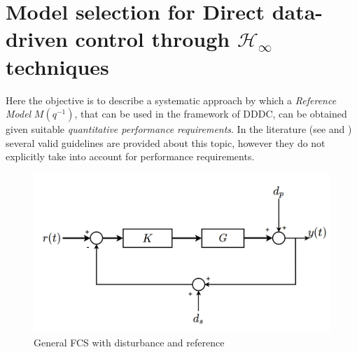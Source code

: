 \chapter[$\mathcal{H}_\infty$ approch for reference model in DDDC]{Model selection for Direct data-driven control through $\mathcal{H}_\infty$ techniques}
Here the objective is to describe a systematic approach by which a \textit{Reference Model} $M(q^{-1})$, that can be used in the framework of DDDC, can be obtained given suitable \textit{quantitative performance requirements}. In the literature (see \citeauthor*{campestrini2016unbiased} \cite{campestrini2016unbiased} and \citeauthor*{da2018choice} \cite{da2018choice}) several valid guidelines are provided about this topic, however they do not explicitly take into account for performance requirements.

\begin{figure}[h]
    \centering
    \includegraphics[scale=0.3]{img/RefMod_1.png}
    \caption{General FCS with disturbance and reference}
    \label{fig: gen_FCS}
\end{figure}

